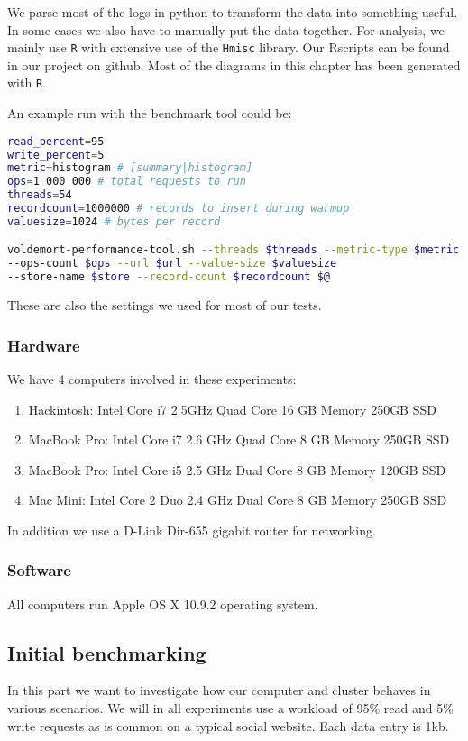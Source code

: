 We parse most of the logs in python to transform the data into something useful. In some cases we also have to manually put the data together.
For analysis, we mainly use \texttt{R}\cite{Rproject} with extensive use of the \texttt{Hmisc}\cite{Hmisc} library. Our Rscripts can be found in our project on github\cite{githubproject}. Most of the diagrams in this chapter has been generated with \texttt{R}.

An example run with the benchmark tool could be:
\begin{lstlisting}[language=bash]
read_percent=95
write_percent=5
metric=histogram # [summary|histogram]
ops=1 000 000 # total requests to run
threads=54
recordcount=1000000 # records to insert during warmup
valuesize=1024 # bytes per record

voldemort-performance-tool.sh --threads $threads --metric-type $metric 
--ops-count $ops --url $url --value-size $valuesize 
--store-name $store --record-count $recordcount $@
\end{lstlisting}

These are also the settings we used for most of our tests.

\subsubsection{Hardware}
We have 4 computers involved in these experiments:

\begin{enumerate}
	\item Hackintosh: Intel Core i7 2.5GHz Quad Core  16 GB Memory 250GB SSD
	\item MacBook Pro: Intel Core i7 2.6 GHz Quad Core 8 GB Memory 250GB SSD
	\item MacBook Pro: Intel Core i5 2.5 GHz Dual Core 8 GB Memory 120GB SSD
	\item Mac Mini: Intel Core 2 Duo 2.4 GHz Dual Core 8 GB Memory 250GB SSD
\end{enumerate}

In addition we use a D-Link Dir-655 gigabit router for networking.

\subsubsection{Software}
All computers run Apple OS X 10.9.2 operating system. 

\subsection{Initial benchmarking}
In this part we want to investigate how our computer and cluster behaves in various scenarios. We will in all experiments use a workload of 95\% read and 5\% write requests as is common on a typical social website. Each data entry is 1kb. 


